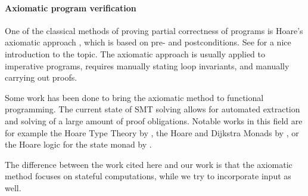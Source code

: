 \paragraph{Axiomatic program verification}
One of the classical methods of proving partial correctness of programs is Hoare's axiomatic approach \cite{Hoare1969}, which is based on pre- and postconditions.
See \citet{NielsonN1992} for a nice introduction to the topic.
The axiomatic approach is usually applied to imperative programs, requires manually stating loop invariants, and manually carrying out proofs.

Some work has been done to bring the axiomatic method to functional programming.
The current state of SMT solving allows for automated extraction and solving of a large amount of proof obligations.
Notable works in this field are for example the Hoare Type Theory by \citet{NanevskiMB2006}, the Hoare and Dijkstra Monads by \citet{NanevskiMSGB08, SwamyWSCL2013}, or the Hoare logic for the state monad by \citet{Swierstra2009}.

The difference between the work cited here and our work is that the axiomatic method focuses on stateful computations, while we try to incorporate input as well.
